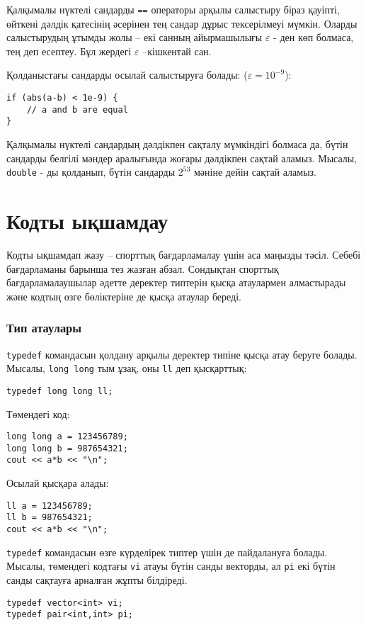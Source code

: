 Қалқымалы нүктелі сандарды \texttt{==} операторы 
арқылы салыстыру біраз қауіпті,  өйткені дәлдік қатесінің әсерінен тең сандар дұрыс тексерілмеуі мүмкін.
Оларды салыстырудың ұтымды жолы – екі санның айырмашылығы $\varepsilon$ - ден 
көп болмаса, тең деп есептеу.
Бұл жердегі $\varepsilon$ –кішкентай сан.

Қолданыстағы сандарды осылай салыстыруға болады: ($\varepsilon=10^{-9}$):

\begin{lstlisting}
if (abs(a-b) < 1e-9) {
    // a and b are equal
}
\end{lstlisting}

Қалқымалы нүктелі сандардың дәлдікпен сақталу мүмкіндігі болмаса да,
бүтін сандарды белгілі мәндер аралығында жоғары дәлдікпен сақтай аламыз.
Мысалы, \texttt{double} - ды қолданып,
бүтін сандарды $2^{53}$ мәніне дейін сақтай аламыз.

\section{Кодты ықшамдау}

Кодты ықшамдап жазу -- спорттық бағдарламалау үшін аса маңызды тәсіл. Себебі бағдарламаны барынша тез жазған абзал.
Сондықтан спорттық бағдарламалаушылар әдетте
деректер типтерін қысқа атаулармен алмастырады және 
кодтың өзге бөліктеріне де қысқа атаулар береді.

\subsubsection{Тип атаулары}
\texttt{typedef} командасын қолдану арқылы
деректер типіне қысқа атау беруге болады.
Мысалы, \texttt{long long} тым ұзақ,
оны \texttt{ll} деп қысқарттық:
\begin{lstlisting}
typedef long long ll;
\end{lstlisting}
Төмендегі код:
\begin{lstlisting}
long long a = 123456789;
long long b = 987654321;
cout << a*b << "\n";
\end{lstlisting}
Осылай қысқара алады:
\begin{lstlisting}
ll a = 123456789;
ll b = 987654321;
cout << a*b << "\n";
\end{lstlisting}

\texttt{typedef} командасын
өзге күрделірек типтер үшін де пайдалануға болады. Мысалы, төмендегі кодтағы \texttt{vi} атауы бүтін санды векторды, ал
 \texttt{pi} екі бүтін санды сақтауға арналған жұпты білдіреді.
\begin{lstlisting}
typedef vector<int> vi;
typedef pair<int,int> pi;
\end{lstlisting}

